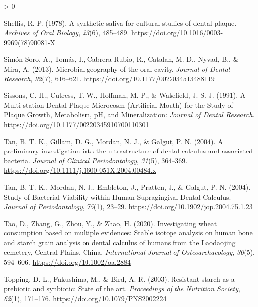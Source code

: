 \documentclass[
]{article}
\newlength{\cslhangindent}
\newenvironment{CSLReferences}[2] %
 {%
  \setlength{\parindent}{0pt}
  \ifodd #1 \everypar{\setlength{\hangindent}{\cslhangindent}}\ignorespaces\fi
  \ifnum #2 > 0
  \setlength{\parskip}{#2\baselineskip}
  \fi
 }%
 {}
\begin{document}
\begin{CSLReferences}{1}{0}
\leavevmode\hypertarget{ref-shellisSyntheticSalivaCultural1978}{}%
Shellis, R. P. (1978). A synthetic saliva for cultural studies of dental plaque. \emph{Archives of Oral Biology}, \emph{23}(6), 485--489. \url{https://doi.org/10.1016/0003-9969(78)90081-X}

\leavevmode\hypertarget{ref-simon-soroOralGeography2013}{}%
Simón-Soro, A., Tomás, I., Cabrera-Rubio, R., Catalan, M. D., Nyvad, B., \& Mira, A. (2013). Microbial geography of the oral cavity. \emph{Journal of Dental Research}, \emph{92}(7), 616--621. \url{https://doi.org/10.1177/0022034513488119}

\leavevmode\hypertarget{ref-sissonsMultistationDentalPlaque1991}{}%
Sissons, C. H., Cutress, T. W., Hoffman, M. P., \& Wakefield, J. S. J. (1991). A {Multi}-station {Dental Plaque Microcosm} ({Artificial Mouth}) for the {Study} of {Plaque Growth}, {Metabolism}, {pH}, and {Mineralization}: \emph{Journal of Dental Research}. \url{https://doi.org/10.1177/00220345910700110301}

\leavevmode\hypertarget{ref-tanCalculusUltrastructure2004}{}%
Tan, B. T. K., Gillam, D. G., Mordan, N. J., \& Galgut, P. N. (2004). A preliminary investigation into the ultrastructure of dental calculus and associated bacteria. \emph{Journal of Clinical Periodontology}, \emph{31}(5), 364--369. \url{https://doi.org/10.1111/j.1600-051X.2004.00484.x}

\leavevmode\hypertarget{ref-tanBacterialViability2004}{}%
Tan, B. T. K., Mordan, N. J., Embleton, J., Pratten, J., \& Galgut, P. N. (2004). Study of {Bacterial Viability} within {Human Supragingival Dental Calculus}. \emph{Journal of Periodontology}, \emph{75}(1), 23--29. \url{https://doi.org/10.1902/jop.2004.75.1.23}

\leavevmode\hypertarget{ref-taoWheatCalculus2020}{}%
Tao, D., Zhang, G., Zhou, Y., \& Zhao, H. (2020). Investigating wheat consumption based on multiple evidences: Stable isotope analysis on human bone and starch grain analysis on dental calculus of humans from the {Laodaojing} cemetery, {Central Plains}, {China}. \emph{International Journal of Osteoarchaeology}, \emph{30}(5), 594--606. \url{https://doi.org/10.1002/oa.2884}

\leavevmode\hypertarget{ref-toppingResistantStarch2003}{}%
Topping, D. L., Fukushima, M., \& Bird, A. R. (2003). Resistant starch as a prebiotic and synbiotic: State of the art. \emph{Proceedings of the Nutrition Society}, \emph{62}(1), 171--176. \url{https://doi.org/10.1079/PNS2002224}


\end{CSLReferences}
\end{document}
